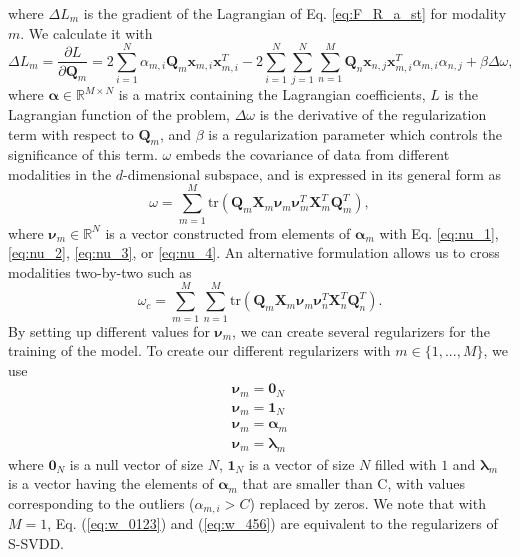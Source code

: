 where $\Delta L_m$ is the gradient of the Lagrangian of Eq. \eqref{eq:F_R_a_st} for modality $m$. We calculate it with
\begin{equation}\label{eq:Delta_L}
\Delta L_m = \frac{\partial L}{\partial \mathbf{Q}_m} = 2\sum_{i=1}^{N} \alpha_{m,i} \mathbf{Q}_m \mathbf{x}_{m,i} \mathbf{x}_{m,i}^T
- 2\sum_{i=1}^{N}\sum_{j=1}^{N}\sum_{n=1}^{M} \mathbf{Q}_n \mathbf{x}_{n,j} \mathbf{x}_{m,i}^T \alpha_{m,i} \alpha_{n,j} + \beta\Delta \omega,
\end{equation}
where $\boldsymbol{\alpha} \in \mathbb{R}^{M \times N}$ is a matrix containing the Lagrangian coefficients, $L$ is the Lagrangian function of the problem, $\Delta \omega$ is the derivative of the regularization term with respect to $\mathbf{Q}_m$, and $\beta$ is a regularization parameter which controls the significance of this term. $\omega$ embeds the covariance of data from different modalities in the $d$-dimensional subspace, and is expressed in its general form as
\begin{equation}\label{eq:w_0123}
\omega = \sum_{m=1}^{M}  \text{tr}(\mathbf{Q}_m\mathbf{X}_m \boldsymbol{\nu}_m \boldsymbol{\nu}^T_m \mathbf{X}^T_m\mathbf{Q}^T_m),
\end{equation}
where $\boldsymbol{\nu}_m \in \mathbb{R}^N$ is a vector constructed from elements of $\boldsymbol{\alpha}_m$ with Eq. \eqref{eq:nu_1}, \eqref{eq:nu_2}, \eqref{eq:nu_3}, or \eqref{eq:nu_4}.
An alternative formulation allows us to cross modalities two-by-two such as
\begin{equation}\label{eq:w_456}
\omega_c = \sum_{m=1}^{M} \sum_{n=1}^{M}  \text{tr}(\mathbf{Q}_m\mathbf{X}_m \boldsymbol{\nu}_m \boldsymbol{\nu}^T_n \mathbf{X}^T_n\mathbf{Q}^T_n).
\end{equation}
By setting up different values for $\mathbf{\nu}_m$, we can create several regularizers for the training of the model. To create our different regularizers with $m \in \{1, ..., M\}$, we use
\begin{eqnarray}
\boldsymbol{\nu}_m = \mathbf{0}_N \label{eq:nu_1}\\
\boldsymbol{\nu}_m = \mathbf{1}_N \label{eq:nu_2}\\
\boldsymbol{\nu}_m = \boldsymbol{\alpha}_m \label{eq:nu_3}\\
\boldsymbol{\nu}_m = \boldsymbol{\lambda}_m\label{eq:nu_4}
\end{eqnarray}
where $\mathbf{0}_N$ is a null vector of size $N$, $\mathbf{1}_N$ is a vector of size $N$ filled with $1$ and $\boldsymbol{\lambda}_m$ is a vector having the elements of $\boldsymbol{\alpha}_m$ that are smaller than C, with values corresponding to the outliers ($\alpha_{m,i}>C$) replaced by zeros. We note that with $M=1$, Eq. (\ref{eq:w_0123}) and (\ref{eq:w_456}) are equivalent to the regularizers of S-SVDD.


